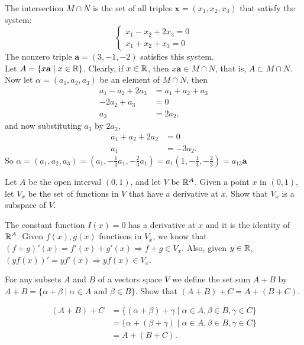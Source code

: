 \documentclass[../../main.tex]{subfiles}
\begin{document}
\begin{solution}
The intersection $M \cap N$ is the set of all triples $\mathbf{x} = (x_1, x_2, x_3)$ that satisfy the system:
\[
\begin{cases}
	x_1 - x_2 + 2x_3 = 0 \\
	x_1 + x_2 + x_3 = 0
\end{cases}
\]
The nonzero triple $\mathbf{a} = (3,-1,-2)$ satisfies this system. \\ 
Let $ A = \{x\mathbf{a} \mid x \in \mathbb{R}\}$. Clearly, if $x \in \mathbb{R}$, then $x\mathbf{a} \in M \cap N$, that is, $A \subset M \cap N$.
Now let $\alpha = (a_1, a_2, a_3)$ be an element of $M \cap N$, then
\begin{align*}
a_1 - a_2 + 2a_3 &= a_1 + a_2 + a_3	\\
-2a_2 + a_3 &= 0 \\
a_3 &= 2a_2, 
\end{align*}
and now substituting $a_3$ by $2a_2$,
\begin{align*}
a_1 + a_2 + 2a_2 &= 0 \\
a_1 &= -3a_2.	
\end{align*}
So $\alpha = (a_1, a_2, a_3) = (a_1, - \frac{1}{3}a_1, -\frac{2}{3}a_1) = a_1(1, - \frac{1}{3}, - \frac{2}{3}) = a_13\mathbf{a}$

\end{solution}
\begin{problem}
Let $A$ be the open interval $(0,1)$, and let $V$ be $\mathbb{R}^A$.
Given a point $x$ in $(0,1)$, let $V_x$ be the set of functions in $V$ that have a derivative at $x$.
Show that $V_x$ is a subspace of $V$.
\end{problem}
\begin{solution}
The constant function $I(x) = 0$ has a derivative at $x$ and it is the identity of $\mathbb{R}^A$. Given $f(x),g(x)$	
functions in $V_x$, we know that $(f+g)'(x) = f'(x) + g'(x) \Rightarrow f+g \in V_x$. Also, given $y \in \mathbb{R}$, $(yf(x))' = yf'(x) \Rightarrow yf(x) \in V_x$.
\end{solution}
\begin{problem}
 For any subsets $A$ and $B$ of a vectors space $V$ we define the set sum $A+B$ by $A+B = \{\alpha + \beta \mid \alpha \in A \text{ and } \beta \in B\}$.
 Show that $(A+B)+C = A+(B+C)$.	
\end{problem}
\begin{solution}
\begin{align*}
(A+B)+C &= \{ (\alpha + \beta) + \gamma \mid \alpha \in A, \beta \in B, \gamma \in C\} \\
&= \{ \alpha + (\beta + \gamma) \mid \alpha \in A, \beta \in B, \gamma \in C\} \\
&= A + (B+C).	
\end{align*}
\end{solution}
\end{document}
